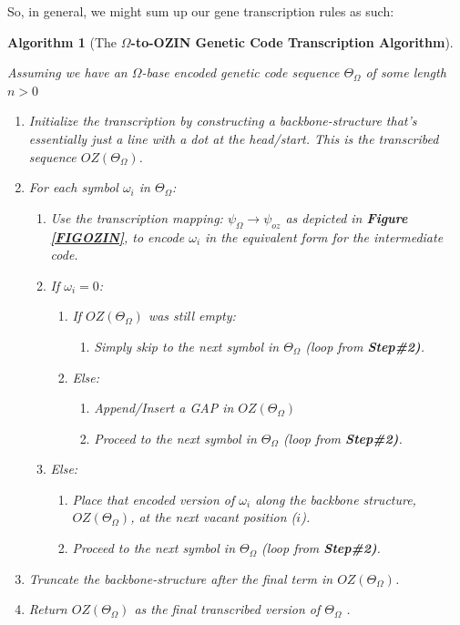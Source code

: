 \documentclass[a4paper, 18pt]{book} %
\newtheorem{alg}{Algorithm}
\begin{document}
So, in general, we might sum up our gene transcription rules as such:

\begin{alg}[The \textbf{$\Omega$-to-OZIN Genetic Code Transcription Algorithm}]
\label{ALGCOZIN}

Assuming we have an $\Omega$-base encoded genetic code sequence $\Theta_\Omega$ of some length $n > 0$

\begin{enumerate}
\item Initialize the transcription by constructing a backbone-structure that's essentially just a line with a dot at the head/start. This is the transcribed sequence $OZ(\Theta_\Omega)$.
\item{For each symbol $\omega_i$ in $\Theta_\Omega$: 
\begin{enumerate}
\item Use the transcription mapping: $\psi_\Omega \rightarrow \psi_{oz}$ as depicted in \textbf{Figure \ref{FIGOZIN}}, to encode $\omega_i$  in the equivalent form for the intermediate code.
	\item{If $\omega_i = 0$:
	\begin{enumerate}
	\item{ If $OZ(\Theta_\Omega)$ was still empty:
	\begin{enumerate}
		\item Simply skip to the next symbol in $\Theta_\Omega$ (loop from \textbf{Step\#2)}.
	\end{enumerate}
		}
		\item{ Else: 
		\begin{enumerate}
		\item  Append/Insert a GAP in $OZ(\Theta_\Omega)$
		\item Proceed to the next symbol in $\Theta_\Omega$ (loop from \textbf{Step\#2)}.
		\end{enumerate}
		}
	\end{enumerate}
	}
	\item { Else:
	\begin{enumerate}
	\item Place that encoded version of $\omega_i$ along the backbone structure, $OZ(\Theta_\Omega)$, at the next vacant position ($i$).
	\item Proceed to the next symbol in $\Theta_\Omega$ (loop from \textbf{Step\#2)}.
	\end{enumerate}
	}
\end{enumerate}
}
\item Truncate the backbone-structure after the final term in $OZ(\Theta_\Omega)$.
\item Return $OZ(\Theta_\Omega)$ as the final transcribed version of $\Theta_\Omega$ .
\end{enumerate}

\end{alg}
\end{document}
